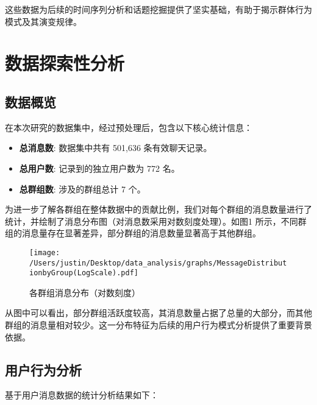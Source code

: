 \documentclass{paper}
\begin{document}
这些数据为后续的时间序列分析和话题挖掘提供了坚实基础，有助于揭示群体行为模式及其演变规律。

\section{数据探索性分析}

\subsection{数据概览}

在本次研究的数据集中，经过预处理后，包含以下核心统计信息：

\begin{itemize}
    \item \textbf{总消息数}: 数据集中共有 501,636 条有效聊天记录。
    \item \textbf{总用户数}: 记录到的独立用户数为 772 名。
    \item \textbf{总群组数}: 涉及的群组总计 7 个。
\end{itemize}

为进一步了解各群组在整体数据中的贡献比例，我们对每个群组的消息数量进行了统计，并绘制了消息分布图（对消息数采用对数刻度处理）。如图1 所示，不同群组的消息量存在显著差异，部分群组的消息数量显著高于其他群组。

\begin{figure}[H]
    \centering
    \texttt{[image: /Users/justin/Desktop/data\_analysis/graphs/MessageDistributionbyGroup(LogScale).pdf]}
    \caption{各群组消息分布（对数刻度）}
    \label{fig:1}
\end{figure}

从图中可以看出，部分群组活跃度较高，其消息数量占据了总量的大部分，而其他群组的消息量相对较少。这一分布特征为后续的用户行为模式分析提供了重要背景依据。

\subsection{用户行为分析}

基于用户消息数据的统计分析结果如下：
\end{document}
